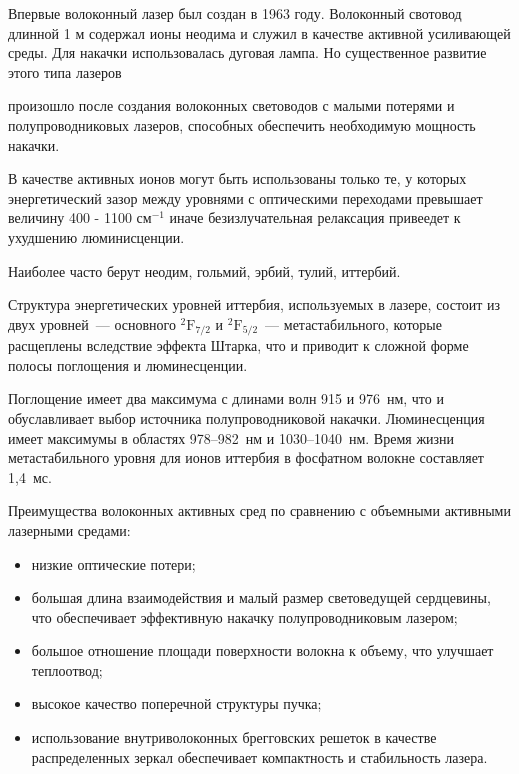 \documentclass[12pt]{article}
\begin{document}
Впервые волоконный лазер был создан в 1963 году. Волоконный свотовод длинной 1 м содержал ионы неодима и служил в качестве активной усиливающей среды. Для накачки использовалась дуговая лампа. Но существенное развитие этого типа лазеров

произошло после создания волоконных световодов с малыми потерями и полупроводниковых лазеров, способных обеспечить необходимую мощность накачки.

\par

В качестве активных ионов могут быть использованы только те, у которых энергетический зазор между уровнями с оптическими переходами превышает величину 400 - 1100 $\text{см}^{-1}$ иначе безизлучательная релаксация привеедет к ухудшению люминисценции.

Наиболее часто берут неодим, гольмий, эрбий, тулий, иттербий.

\par

Структура энергетических уровней иттербия, используемых в лазере, состоит из двух уровней~--- основного ${}^2\mathrm{F}_{7/2}$ и ${}^2\mathrm{F}_{5/2}$~--- метастабильного, которые расщеплены вследствие эффекта Штарка, что и приводит к сложной форме полосы поглощения и люминесценции.\par

Поглощение имеет два максимума с длинами волн 915 и 976~нм, что и обуславливает выбор источника полупроводниковой накачки. Люминесценция имеет максимумы в областях 978--982~нм и 1030--1040~нм. Время жизни метастабильного уровня для ионов иттербия в фосфатном волокне составляет 1,4~мс.

\par

Преимущества волоконных активных сред по сравнению с объемными активными лазерными средами:
\begin{itemize}
    \item низкие оптические потери;
    \item большая длина взаимодействия и малый размер световедущей сердцевины, что обеспечивает эффективную накачку полупроводниковым лазером;
    \item большое отношение площади поверхности волокна к объему, что улучшает теплоотвод;
    \item высокое качество поперечной структуры пучка;
    \item использование внутриволоконных брегговских решеток в качестве распределенных зеркал обеспечивает компактность и стабильность лазера.
\end{itemize}
\end{document}
